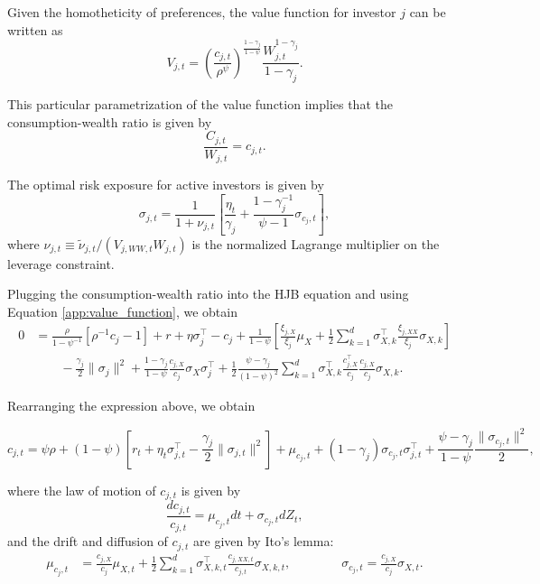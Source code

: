 Given the homotheticity of preferences, the value function for investor $j$ can be written as
\begin{equation}\label{app:value_function}
    V_{j,t} = \left(\frac{c_{j,t}}{\rho^\psi}\right)^{\frac{1-\gamma_j}{1-\psi}} \frac{W_{j,t}^{1-\gamma_j}}{1-\gamma_j}.
\end{equation}

This particular parametrization of the value function implies that the consumption-wealth ratio is given by
\begin{equation}
    \frac{C_{j,t}}{W_{j,t}} = c_{j,t}.
\end{equation}

The optimal risk exposure for active investors is given by
\begin{equation}
    \sigma_{j,t}
    =\frac{1}{1+\nu_{j,t}} \left[ \frac{\eta_t}{\gamma_j}  + \frac{1-\gamma_j^{-1}}{\psi-1} \sigma_{c_j,t} \right],
\end{equation}
where $\nu_{j,t} \equiv \tilde{\nu}_{j,t} / (V_{j,WW,t} W_{j,t})$ is the normalized Lagrange multiplier on the leverage constraint.

Plugging the consumption-wealth ratio into the HJB equation and using Equation \eqref{app:value_function}, we obtain
\begin{align}
        0 &=  \frac{\rho   }{1-\psi^{-1}} \left[  \rho^{-1} c_j-1 \right] + r  + \eta \sigma_j^ \top   - c_j + \frac{1}{1-\psi} \left[ \frac{\xi_{j,X}}{\xi_j} \mu_X + \frac{1}{2} \sum_{k=1}^d \sigma_{X,k}^\top \frac{\xi_{j,XX}}{\xi_j} \sigma_{X,k}\right]\nonumber\\
    &\qquad - \frac{\gamma_j}{2} \| \sigma_j\|^2  + \frac{1-\gamma_j}{1-\psi} \frac{c_{j,X}}{c_j} \sigma_X  \sigma_j^ \top    + \frac{1}{2} \frac{\psi-\gamma_j}{(1-\psi)^2} \sum_{k=1}^d \sigma_{X,k}^\top \frac{c_{j,X}^\top}{c_j} \frac{c_{j,X}}{c_j} \sigma_{X,k}.
\end{align}

Rearranging the expression above, we obtain
\begin{small}
\begin{equation}
    c_{j,t} = \psi \rho + (1-\psi) \left[ r_t + \eta_t \sigma_{j,t}^\top - \frac{\gamma_j}{2} \| \sigma_{j,t}\|^2 \right] + \mu_{c_j,t} + (1-\gamma_j)  \sigma_{c_j,t} \sigma_{j,t}^\top + \frac{\psi - \gamma_j}{1-\psi} \frac{\|\sigma_{c_j,t} \|^2}{2},
\end{equation}
\end{small}
where the law of motion of $c_{j,t}$ is given by
\begin{equation}
    \frac{d c_{j,t}}{c_{j,t}} = \mu_{c_j,t} dt + \sigma_{c_j,t} d Z_t,
\end{equation}
and the drift and diffusion of $c_{j,t}$ are given by Ito's lemma:
\begin{align}
    \mu_{c_j,t} &= \frac{c_{j,X}}{c_j} \mu_{X,t} + \frac{1}{2} \sum_{k=1}^d \sigma_{X,k,t}^\top \frac{c_{j,XX,t}}{c_{j,t}} \sigma_{X,k,t}, \qquad \qquad 
    \sigma_{c_j,t} = \frac{c_{j,X}}{c_j} \sigma_{X,t}.
\end{align}


